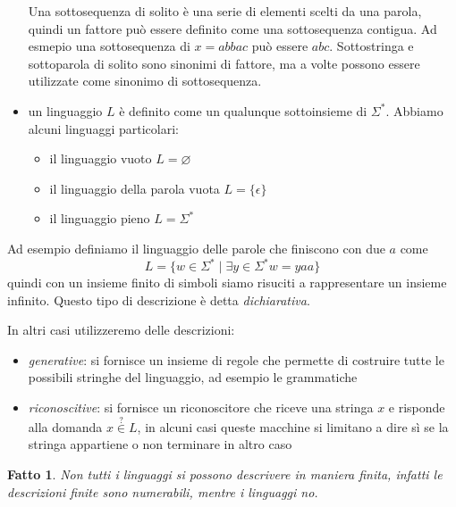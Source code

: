 \documentclass[12pt]{report}
\newtheorem{fatto}{Fatto}
\begin{document}
\begin{itemize}
		Una sottosequenza di solito è una serie di elementi scelti da una parola, quindi un fattore può essere definito come una sottosequenza contigua. 
		Ad esmepio una sottosequenza di $x = abbac$ può essere $abc$.
		Sottostringa e sottoparola di solito sono sinonimi di fattore, ma a volte possono essere utilizzate come sinonimo di sottosequenza.
	\item un linguaggio $L$ è definito come un qualunque sottoinsieme di $\Sigma^*$.
		Abbiamo alcuni linguaggi particolari:
		\begin{itemize}
			\item il linguaggio vuoto $L = \varnothing$
			\item il linguaggio della parola vuota $L = \{ \epsilon \}$
			\item il linguaggio pieno $L = \Sigma^*$
		\end{itemize}
\end{itemize}

Ad esempio definiamo il linguaggio delle parole che finiscono con due $a$ come
$$ L = \{ w \in \Sigma^* \mid \exists y \in \Sigma^* w = yaa \} $$
quindi con un insieme finito di simboli siamo risuciti a rappresentare un insieme infinito.
Questo tipo di descrizione è detta \textit{dichiarativa}.

In altri casi utilizzeremo delle descrizioni:
\begin{itemize}
	\item \textit{generative}: si fornisce un insieme di regole che permette di costruire tutte le possibili stringhe del linguaggio, ad esempio le grammatiche
	\item \textit{riconoscitive}: si fornisce un riconoscitore che riceve una stringa $x$ e risponde alla domanda $x \overset{?}{\in} L$, in alcuni casi queste macchine si limitano a dire sì se la stringa appartiene o non terminare in altro caso
\end{itemize}

\begin{fatto}
	Non tutti i linguaggi si possono descrivere in maniera finita, infatti le descrizioni finite sono numerabili, mentre i linguaggi no.
\end{fatto}
\end{document}
